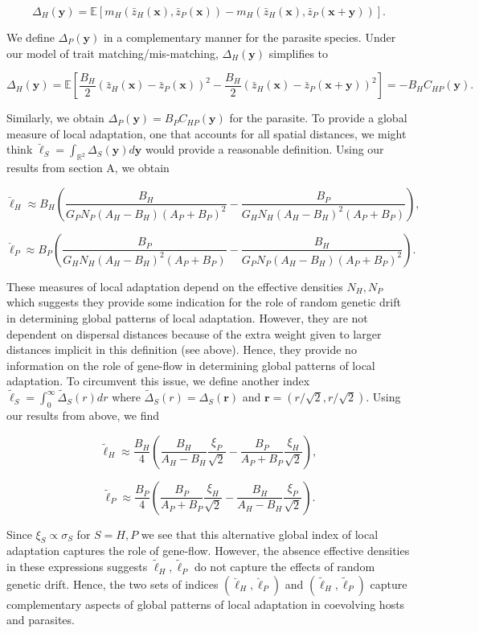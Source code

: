 \documentclass{article}
\begin{document}
\[\Delta_H(\pmb y)=\mathbb E[m_H(\bar z_H(\pmb x),\bar z_P(\pmb x))-m_H(\bar z_H(\pmb x),\bar z_P(\pmb x+\pmb y))].\]

We define \(\Delta_P(\pmb y)\) in a complementary manner for the
parasite species. Under our model of trait matching/mis-matching,
\(\Delta_H(\pmb y)\) simplifies to

\[\Delta_H(\pmb y)=\mathbb E\left[\frac{B_H}{2}\left(\bar z_H(\pmb x)-\bar z_P(\pmb x)\right)^2-\frac{B_H}{2}\left(\bar z_H(\pmb x)-\bar z_P(\pmb x+\pmb y)\right)^2\right]=-B_HC_{HP}(\pmb y).\]

Similarly, we obtain \(\Delta_P(\pmb y)=B_PC_{HP}(\pmb y)\) for the
parasite. To provide a global measure of local adaptation, one that
accounts for all spatial distances, we might think
\(\breve{\ell}_S=\int_{\mathbb R^2}\Delta_S(\pmb y)d\pmb y\) would
provide a reasonable definition. Using our results from section A, we
obtain

\[\breve{\ell}_H\approx B_H\left(\frac{B_H}{G_PN_P(A_H-B_H)(A_P+B_P)^2}-\frac{B_P}{G_HN_H(A_H-B_H)^2(A_P+B_P)}\right),\]

\[\breve{\ell}_P\approx B_P\left(\frac{B_P}{G_HN_H(A_H-B_H)^2(A_P+B_P)}-\frac{B_H}{G_PN_P(A_H-B_H)(A_P+B_P)^2}\right).\]

These measures of local adaptation depend on the effective densities
\(N_H,N_P\) which suggests they provide some indication for the role of
random genetic drift in determining global patterns of local adaptation.
However, they are not dependent on dispersal distances because of the
extra weight given to larger distances implicit in this definition (see
above). Hence, they provide no information on the role of gene-flow in
determining global patterns of local adaptation. To circumvent this
issue, we define another index
\(\tilde{\ell}_S=\int_0^\infty\tilde\Delta_S(r)dr\) where
\(\tilde\Delta_S(r)=\Delta_S(\pmb r)\) and
\(\pmb r=(r/\sqrt2,r/\sqrt2)\). Using our results from above, we find

\[\tilde{\ell}_H\approx\frac{B_H}{4}\left(\frac{B_H}{A_H-B_H}\frac{\xi_P}{\sqrt2}-\frac{B_P}{A_P+B_P}\frac{\xi_H}{\sqrt2}\right),\]

\[\tilde{\ell}_P\approx\frac{B_P}{4}\left(\frac{B_P}{A_P+B_P}\frac{\xi_H}{\sqrt2}-\frac{B_H}{A_H-B_H}\frac{\xi_P}{\sqrt2}\right).\]

Since \(\xi_S\propto\sigma_S\) for \(S=H,P\) we see that this
alternative global index of local adaptation captures the role of
gene-flow. However, the absence effective densities in these expressions
suggests \(\tilde{\ell}_H,\tilde{\ell}_P\) do not capture the effects of
random genetic drift. Hence, the two sets of indices
\((\breve{\ell}_H,\breve{\ell}_P)\) and
\((\tilde{\ell}_H,\tilde{\ell}_P)\) capture complementary aspects of
global patterns of local adaptation in coevolving hosts and parasites.
\end{document}
